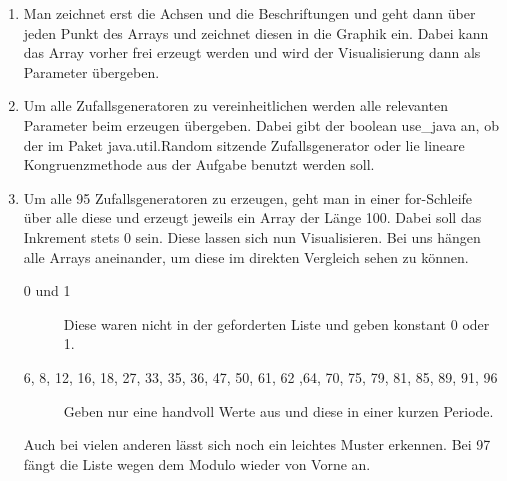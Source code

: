 \documentclass[a4paper,11pt]{article}             %
\begin{document}

\begin{enumerate}

\item Man zeichnet erst die Achsen und die Beschriftungen und geht dann über jeden Punkt des Arrays und zeichnet diesen in die Graphik ein. Dabei kann das Array vorher frei erzeugt werden und wird der Visualisierung dann als Parameter übergeben.

\item Um alle Zufallsgeneratoren zu vereinheitlichen werden alle relevanten Parameter beim erzeugen übergeben. Dabei gibt der boolean use\_java an, ob der im Paket java.util.Random sitzende Zufallsgenerator oder lie lineare Kongruenzmethode aus der Aufgabe benutzt werden soll.

\item Um alle 95 Zufallsgeneratoren zu erzeugen, geht man in einer for-Schleife über alle diese und erzeugt jeweils ein Array der Länge 100. Dabei soll das Inkrement stets 0 sein. Diese lassen sich nun Visualisieren. Bei uns hängen alle Arrays aneinander, um diese im direkten Vergleich sehen zu können.

\begin{description}
\item [0 und 1] Diese waren nicht in der geforderten Liste und geben konstant 0 oder 1.
\item [6, 8, 12, 16, 18, 27, 33, 35, 36, 47, 50, 61, 62 ,64, 70, 75, 79, 81, 85, 89, 91, 96] Geben nur eine handvoll Werte aus und diese in einer kurzen Periode.
\end{description}

Auch bei vielen anderen lässt sich noch ein leichtes Muster erkennen.
Bei 97 fängt die Liste wegen dem Modulo wieder von Vorne an.

\end{enumerate}
\end{document}
